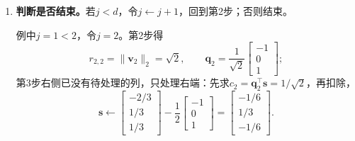 \begin{enumerate}
 例中对第二列，先求分量$r_{1,2}=\bm q_1^\top\bm v_2=\sqrt3$，再扣除：
 \[
  \bm v_2\leftarrow\begin{bmatrix}0\\1\\2\end{bmatrix}-\begin{bmatrix}1\\1\\1\end{bmatrix}=\begin{bmatrix}-1\\0\\1\end{bmatrix}.
 \]
 对右端，先求$c_1=\bm q_1^\top\bm s=5/\sqrt3$，再扣除：
 \[
  \bm s\leftarrow\begin{bmatrix}1\\2\\2\end{bmatrix}-\frac53\begin{bmatrix}1\\1\\1\end{bmatrix}=\begin{bmatrix}-2/3\\1/3\\1/3\end{bmatrix}.
 \]

 在直线拟合中，扣除全一方向$\bm q_1$就是减去平均值：$\bm v_2$是横坐标$0,1,2$减去均值$1$，$\bm s$是$\bm b$减去均值$5/3$。

 \item \textbf{判断是否结束。}若$j<d$，令$j\leftarrow j+1$，回到第2步；否则结束。

 例中$j=1<2$，令$j=2$。第2步得
 \[
  r_{2,2}=\lVert\bm v_2\rVert_2=\sqrt2,\qquad
  \bm q_2=\frac1{\sqrt2}\begin{bmatrix}-1\\0\\1\end{bmatrix};
 \]
 第3步右侧已没有待处理的列，只处理右端：先求$c_2=\bm q_2^\top\bm s=1/\sqrt2$，再扣除，
 \[
  \bm s\leftarrow\begin{bmatrix}-2/3\\1/3\\1/3\end{bmatrix}-\frac12\begin{bmatrix}-1\\0\\1\end{bmatrix}=\begin{bmatrix}-1/6\\1/3\\-1/6\end{bmatrix}.
 \]


\end{enumerate}
